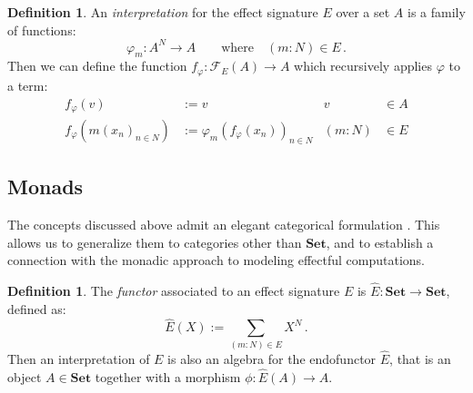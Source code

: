 \documentclass[draft,11pt]{report}
\theoremstyle{definition}
\newtheorem{definition}[theorem]{Definition}
\begin{document}
\begin{definition}
An \emph{interpretation}
for the effect signature $E$
over a set $A$
is a family of functions:
\[
  \varphi_m : A^N \rightarrow A
  \qquad \text{where} \quad
  (m : N) \in E \,.
\]
Then we can define the function
$f_\varphi : \mathcal{F}_E(A) \rightarrow A$
which recursively applies $\varphi$ to a term:
\begin{align*}
  f_\varphi(v) &:= v & v &\in A \\
  f_\varphi(m(x_n)_{n \in N}) &:= \varphi_m(f_\varphi(x_n))_{n \in N}
    & (m : N) &\in E
\end{align*}
\end{definition}


\subsection{Monads} \label{sec:freemon} %

The concepts discussed above admit an elegant
categorical formulation \citep{freemon}.
This allows us to generalize them
to categories other than $\mathbf{Set}$,
and to establish a connection with
the monadic approach to modeling effectful computations.

\begin{definition}
The \emph{functor} associated to an effect signature $E$
is $\hat{E} : \mathbf{Set} \rightarrow \mathbf{Set}$,
defined as:
\[
    \hat{E}(X) := \sum_{(m : N) \in E} X^N \,.
\]
Then an interpretation of $E$ is also
an algebra for the endofunctor $\hat{E}$,
that is an object $A \in \mathbf{Set}$
together with a morphism $\phi : \hat{E}(A) \rightarrow A$.
\end{definition}
\end{document}
